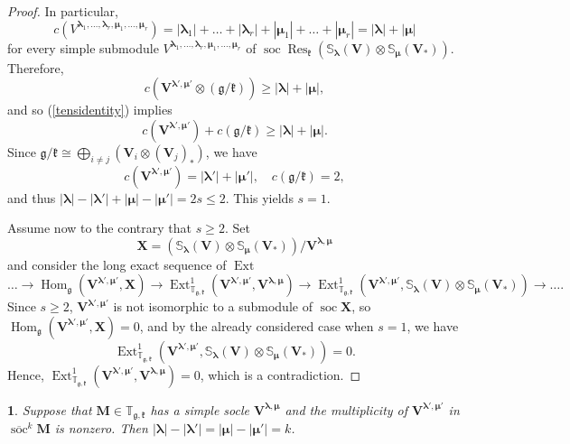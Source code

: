 \documentclass[12pt,oneside,english]{amsart}
\numberwithin{equation}{section}
\numberwithin{figure}{section}
\theoremstyle{plain}
\theoremstyle{plain}
\theoremstyle{remark}
\theoremstyle{definition}
\theoremstyle{plain}
\theoremstyle{remark}
\theoremstyle{definition}
\theoremstyle{plain}
\newtheorem{cor}[thm]{\protect\corollaryname}
\theoremstyle{plain}
\theoremstyle{definition}
\providecommand{\corollaryname}{Corollary}
\newcommand{\bV}{\mathbf{V}}
\newcommand{\bX}{\mathbf{X}}
\newcommand{\bM}{\mathbf{M}}
\newcommand{\soc}{\operatorname{soc}}
\newcommand{\Hom}{\operatorname{Hom}}
\newcommand{\Ext}{\operatorname{Ext}}
\newcommand{\fg}{\mathfrak{g}}
\newcommand{\fk}{\mathfrak{k}}
\newcommand{\Res}{\operatorname{Res}}
\begin{document}
\begin{proof}
     In particular,
     $$c(V^{\boldsymbol{\lambda}_1,\dots,\boldsymbol{\lambda}_r,{\boldsymbol{\mu}}_1,\dots,{\boldsymbol{\mu}}_r})=|\boldsymbol{\lambda}_1|+\dots+|\boldsymbol{\lambda}_r|+|{\boldsymbol{\mu}}_1|+\dots+|{\boldsymbol{\mu}}_r|=|\boldsymbol{\lambda}|+|{\boldsymbol{\mu}}|$$
 for every simple submodule $V^{\boldsymbol{\lambda}_1,\dots,\boldsymbol{\lambda}_r,{\boldsymbol{\mu}}_1,\dots,{\boldsymbol{\mu}}_r}$ of $\soc\Res_{\fk}(\mathbb{S}_{\boldsymbol{\lambda}}(\bV)\otimes \mathbb{S}_{{\boldsymbol{\mu}}}(\bV_*))$.
Therefore, $$c(\bV^{\boldsymbol{\lambda}',{\boldsymbol{\mu}}'}\otimes (\fg/\fk))\geq |\boldsymbol{\lambda}|+|{\boldsymbol{\mu}}|,$$ and so (\ref{tensidentity}) implies
      $$c(\bV^{\boldsymbol{\lambda}',{\boldsymbol{\mu}}'})+c(\fg/\fk)\geq |\boldsymbol{\lambda}|+|{\boldsymbol{\mu}}|.$$
      Since $\fg/\fk\cong\bigoplus_{i\neq j}( \bV_i\otimes(\bV_j)_*)$,
 we have
      $$c(\bV^{\boldsymbol{\lambda}',{\boldsymbol{\mu}}'})=|\boldsymbol{\lambda}'|+|{\boldsymbol{\mu}}'|,\quad c(\fg/\fk)=2,$$
 and thus $|\boldsymbol{\lambda}|-|\boldsymbol{\lambda}'|+|\boldsymbol{\mu}|-|\boldsymbol{\mu}'|= 2s \leq 2$.
This yields $s=1$.

    Assume now to the contrary that $s\geq 2$. Set $$\bX=(\mathbb{S}_{\boldsymbol{\lambda}}(\bV)\otimes \mathbb{S}_{{\boldsymbol{\mu}}}(\bV_*))/\bV^{\boldsymbol{\lambda},{\boldsymbol{\mu}}}$$ and
      consider the long exact sequence of $\Ext$
      $$\dots\to\Hom_{\fg}(\bV^{\boldsymbol{\lambda}',{\boldsymbol{\mu}}'},\bX)\to \Ext^{1}_{\mathbb T_{\fg,\fk}}(\bV^{\boldsymbol{\lambda}',{\boldsymbol{\mu}}'},\bV^{\boldsymbol{\lambda},{\boldsymbol{\mu}}})\to\Ext^{1}_{\mathbb T_{\fg,\fk}}(\bV^{\boldsymbol{\lambda}',{\boldsymbol{\mu}}'}, \mathbb{S}_{\boldsymbol{\lambda}}(\bV)\otimes \mathbb{S}_{{\boldsymbol{\mu}}}(\bV_*))\to\dots.$$
Since $s\geq 2$, $\bV^{\boldsymbol{\lambda}',{\boldsymbol{\mu}}'}$ is not isomorphic to a submodule of $\soc \bX$, so   $\Hom_{\fg}(\bV^{\boldsymbol{\lambda}',{\boldsymbol{\mu}}'},\bX)=0$,
and by the already considered case when $s=1$, we have
     $$\Ext^{1}_{\mathbb T_{\fg,\fk}}(\bV^{\boldsymbol{\lambda}',{\boldsymbol{\mu}}'}, \mathbb{S}_{\boldsymbol{\lambda}}(\bV)\otimes \mathbb{S}_{{\boldsymbol{\mu}}}(\bV_*))=0.$$
      Hence, $\operatorname{Ext}^1_{\mathbb T_{\fg,\fk}}(\bV^{\boldsymbol{\lambda}',{\boldsymbol{\mu}}'},\bV^{\boldsymbol{\lambda},{\boldsymbol{\mu}}})= 0$, which is a contradiction.
    \end{proof}
    \begin{cor}\label{cor:soc} Suppose that $\bM\in{\mathbb T_{\fg,\fk}} $ has a simple socle $\bV^{\boldsymbol{\lambda},{\boldsymbol{\mu}}}$ and the multiplicity of $\bV^{\boldsymbol{\lambda}',{\boldsymbol{\mu}}'}$ in
      $\overline{\soc}^k \bM$ is nonzero. Then $|\boldsymbol{\lambda}|-|\boldsymbol{\lambda}'|=|{\boldsymbol{\mu}}|-|{\boldsymbol{\mu}}'|=k$.
    \end{cor}
\end{document}
